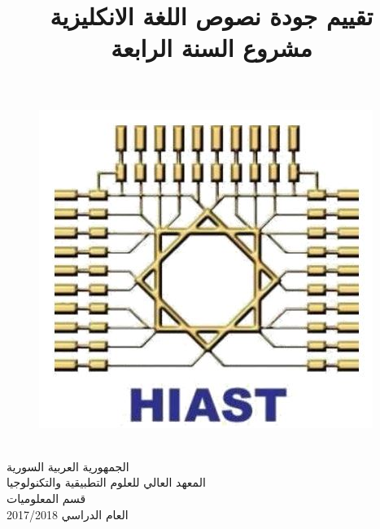 \documentclass{report}
\title{
	\Huge
	تقييم جودة نصوص اللغة الانكليزية \\[2.5mm]
	\Large
	مشروع السنة الرابعة
}
\author{}
\date{}
\begin{document}
	
	\newfontfamily{}
	\newfontfamily{}
	
	{
		\begin{figure}
			\hfill
			\includegraphics[width=0.9\linewidth]{images/HIAST_logo.JPG}
		\end{figure}
		
		\coverfont
		\begin{spacing}{1.8}
			\ \\
			الجمهورية العربية السورية \\
			المعهد العالي للعلوم التطبيقية والتكنولوجيا \\
			قسم المعلوميات \\
			العام الدراسي 2017/2018  \\
		\end{spacing}
	}
	
	{\let\newpage\relax\maketitle}
	
\end{document}
